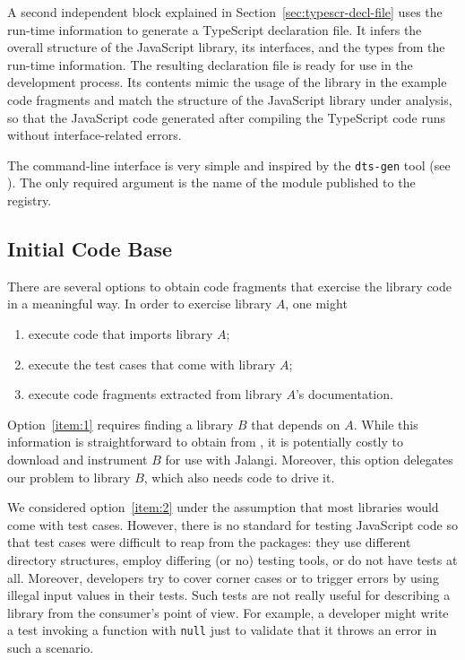 \documentclass[sigconf]{acmart}
\begin{document}
A second independent block explained in
Section~\ref{sec:typescr-decl-file} uses the run-time information to
generate a TypeScript declaration file. It infers the overall
structure of the JavaScript library, its interfaces, and the types
from the run-time information.  The resulting declaration file is
ready for use in the development process. Its contents mimic the usage
of the library in the example code fragments and match the structure
of the JavaScript library under analysis, so that the JavaScript code
generated after compiling the TypeScript code runs without
interface-related errors.

The command-line interface is very simple and inspired by the \texttt{dts-gen} tool
\cite{dts-gen} (see ). The only required
argument is the name of the module published to the \NPM{} registry. 

\subsection{Initial Code Base}
\label{sec:initial-code-base}


There are several options to obtain code fragments that exercise the
library code in a meaningful way. In order to exercise library $A$,
one might
\begin{enumerate}
\item\label{item:1} execute code that imports library $A$;
\item\label{item:2} execute the test cases that come with library $A$;
\item\label{item:3} execute code fragments extracted from library $A$'s documentation.
\end{enumerate}

Option~\ref{item:1} requires finding a library $B$ that depends on
$A$. While this information is straightforward to obtain from \NPM, it
is potentially costly to download and instrument $B$ for use with
Jalangi. Moreover, this option delegates our problem
to library $B$, which also needs code to drive it. 

We considered option~\ref{item:2} under the assumption that most
libraries would come with test cases. However, there is no standard
for testing JavaScript code so that test cases were difficult to reap
from the \NPM{} packages: they use different directory structures,
employ differing (or no) testing tools, or do not have tests
at all. Moreover, developers try to cover corner cases or to trigger errors by using illegal
input values in their tests. Such tests are not really useful for describing a library
from the consumer's point of view. For example, a developer might write a test invoking a
function with \texttt{null} just to validate that it throws an error
in such a scenario. 
\end{document}
